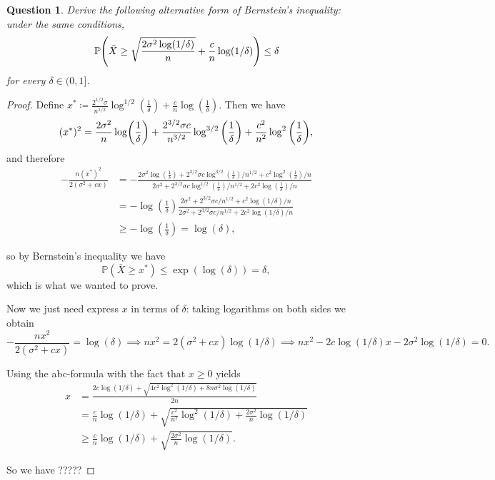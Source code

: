 \documentclass{article}
\theoremstyle{plain}
\newtheorem{question}{Question}
\theoremstyle{remark}
\newcommand{\Bb}{\mathbb}
\newcommand{\PP}{\Bb P}
\newcommand\ceq\coloneqq %
\begin{document}
\begin{question}
	Derive the following alternative form of Bernstein's inequality: under the same conditions, 
	\[
	\PP\qty(\bar X \geq \sqrt{\frac{2\sigma^2 \log(1/\delta)}{n}} + \frac cn \log(1/\delta)) \leq \delta
	\]
	for every $\delta \in (0, 1]$. 
\end{question}

\begin{proof}
	Define $x^* \ceq \frac{2^{1/2}\sigma}{n^{1/2}} \log^{1/2}(\frac1\delta) + \frac cn \log(\frac 1\delta)$. Then we have
	\[
	(x^*)^2 = \frac{2\sigma^2}{n}\log(\frac1\delta) + \frac{2^{3/2}\sigma c}{n^{3/2}} \log^{3/2}\qty(\frac1\delta) + \frac{c^2}{n^2} \log^2\qty(\frac1\delta),
	\]
	and therefore
	\begin{align*}
	-\frac{n(x^*)^2}{2(\sigma^2 + cx)} &= - \frac{2\sigma^2 \log(\frac1\delta) + 2^{3/2}\sigma c \log^{3/2}(\frac1\delta)/n^{1/2} + c^2 \log^2(\frac1\delta)/n}{2\sigma^2 + 2^{3/2} \sigma c \log^{1/2}(\frac1\delta)/n^{1/2} + 2c^2\log(\frac1\delta)/n} \\
	&= -\log(\frac1\delta) \frac{2\sigma^2 + 2^{3/2} \sigma c/n^{1/2} + c^2\log(1/\delta)/n}{2\sigma^2 + 2^{3/2} \sigma c/n^{1/2} + 2c^2\log(1/\delta)/n} \\
	&\geq -\log(\frac1\delta) = \log(\delta),
	\end{align*}
	
	so by Bernstein's inequality we have
	\[
	\PP(\bar X \geq x^*) \leq \exp(\log(\delta)) = \delta, 
	\]
	which is what we wanted to prove. 
	

	Now we just need express $x$ in terms of $\delta$: taking logarithms on both sides we obtain
	\[
	- \frac{nx^2}{2(\sigma^2 + cx)} = \log(\delta) \implies nx^2 = 2(\sigma^2 + cx) \log(1/\delta) \implies nx^2 - 2c\log(1/\delta) x - 2\sigma^2\log(1/\delta) = 0.
	\]
	
	Using the abc-formula with the fact that $x \geq 0$ yields 
	\begin{align*}
	x &= \frac{2c \log(1/\delta) + \sqrt{4c^2\log^2(1/\delta) + 8n\sigma^2\log(1/\delta)}}{2n} \\
	&= \frac cn \log(1/\delta) + \sqrt{\frac{c^2}{n^2}\log^2(1/\delta) + \frac{2\sigma^2}{n} \log(1/\delta)} \\
	&\geq \frac cn \log(1/\delta) + \sqrt{\frac{2\sigma^2}{n} \log(1/\delta)}. 
	\end{align*}

So we have ?????
\end{proof}
\end{document}
